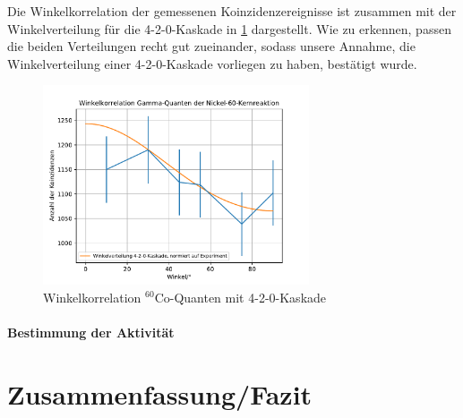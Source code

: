 \documentclass[11pt]{scrartcl}
\begin{document}
Die Winkelkorrelation der gemessenen Koinzidenzereignisse ist zusammen mit der Winkelverteilung für die 4-2-0-Kaskade in \ref{Co60} dargestellt. Wie zu erkennen, passen die beiden Verteilungen recht gut zueinander, sodass unsere Annahme, die Winkelverteilung einer 4-2-0-Kaskade vorliegen zu haben, bestätigt wurde. 


\begin{figure}[htbp]  
     \includegraphics[width=0.7\textwidth]{Winkelkorrelation_Gamma-Quanten_der_Nickel-60-Kernreaktion.pdf}
  \caption{Winkelkorrelation $^{60}$Co-Quanten mit 4-2-0-Kaskade}
  \label{Co60}
\end{figure}

\paragraph{Bestimmung der Aktivität}



\section{Zusammenfassung/Fazit}




\end{document}

